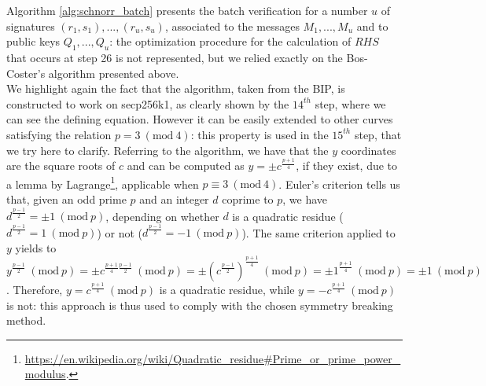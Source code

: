 \bigskip
\noindent
Algorithm \ref{alg:schnorr_batch} presents the batch verification for a number $u$ of signatures $(r_1, s_1), ..., (r_u, s_u)$, associated to the messages $M_1, ..., M_u$ and to public keys $Q_1, ..., Q_u$: the optimization procedure for the calculation of $RHS$ that occurs at step 26 is not represented, but we relied exactly on the Bos-Coster's algorithm presented above. 
\\
We highlight again the fact that the algorithm, taken from the BIP, is constructed to work on secp256k1, as clearly shown by the $14^{th}$ step, where we can see the defining equation. However it can be easily extended to other curves satisfying the relation $p = 3 \ (\text{mod} \ 4)$: this property is used in the $15^{th}$ step, that we try here to clarify. Referring to the algorithm, we have that the $y$ coordinates are the square roots of $c$ and can be computed as $y = \pm c^{\frac{p + 1}{4}}$, if they exist, due to a lemma by Lagrange\footnote{\url{https://en.wikipedia.org/wiki/Quadratic\_residue\#Prime\_or\_prime\_power\_modulus}.}, applicable when $p \equiv 3 \ (\text{mod} \ 4)$. Euler's criterion tells us that, given an odd prime $p$ and an integer $d$ coprime to $p$, we have $d^{\frac{p - 1}{2}} = \pm 1 \ (\text{mod} \ p)$, depending on whether $d$ is a quadratic residue ($d^{\frac{p - 1}{2}} = 1 \ (\text{mod} \ p)$) or not ($d^{\frac{p - 1}{2}} = - 1 \ (\text{mod} \ p)$). The same criterion applied to $y$ yields to $y^{\frac{p - 1}{2}} \ (\text{mod} \ p) = \pm c^{\frac{p + 1}{4}\frac{p - 1}{2}} \ (\text{mod} \ p) = \pm (c^{\frac{p - 1}{2}})^{\frac{p + 1}{4}} \ (\text{mod} \ p) = \pm 1^{\frac{p + 1}{4}} \ (\text{mod} \ p) = \pm 1 \ (\text{mod} \ p)$. Therefore, $y = c^{\frac{p + 1}{4}} \ (\text{mod} \ p)$ is a quadratic residue, while $y = - c^{\frac{p + 1}{4}} \ (\text{mod} \ p)$ is not: this approach is thus used to comply with the chosen symmetry breaking method.
\begin{figure}
	\label{fig:figure6}
\end{figure}

